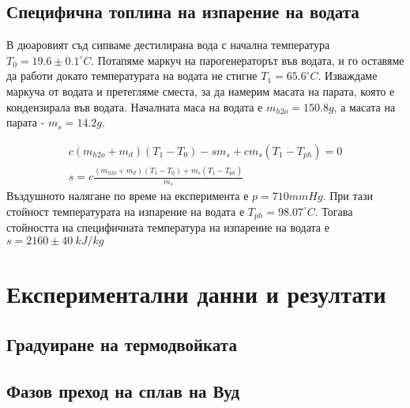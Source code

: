 \documentclass[%
 reprint,
 amsmath,amssymb,
 aps,
]{revtex4-2}
\begin{document}
\subsection{Специфична топлина на изпарение на водата}
В дюаровият съд сипваме дестилирана вода с начална температура $T_0 = 19.6 \pm 0.1^{\circ}C$. Потапяме маркуч на парогенераторът във водата, и го оставяме да работи докато температурата на водата не стигне $T_1 = 65.6^{\circ}C$. Изваждаме маркуча от водата и претегляме сместа, за да намерим масата на парата, която е кондензирала във водата. Началната маса на водата е $m_{h2o}=150.8g$, а масата на парата - $m_s = 14.2g$. 

\begin{gather*}
    c(m_{h2o} + m_d)(T_1 - T_0) - s m_s + c m_s (T_1 - T_{ph}) = 0 \\
    s = c \frac{(m_{h2o} + m_d)(T_1 - T_0) + m_s (T_1 - T_{ph})}{m_s}
\end{gather*}
Въздушното налягане по време на експеримента е $p = 710 mmHg$. При тази стойност температурата на изпарение на водата е $T_{ph} = 98.07^{\circ}C$. Тогава стойността на специфичната температура на изпарение на водата е $s = 2160 \pm 40 \ kJ/kg$
\section{Експериментални данни и резултати}

\subsection{Градуиране на термодвойката}

\subsection{Фазов преход на сплав на Вуд}
\end{document}
